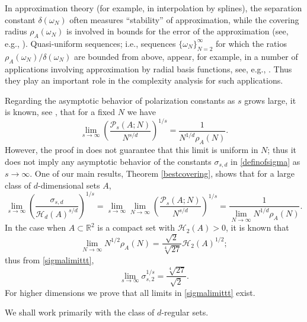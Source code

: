\documentclass[12pt]{amsart}
\theoremstyle{definition}
\def\R{\mathbb{R}}
\newcommand{\1}{\mathbf{1}}
\newcommand{\PP}{\mathcal{P}}
\def\H{\mathcal{H}}
\begin{document}
In approximation theory (for example, in interpolation by splines), the separation constant $\delta(\omega_N)$ often measures ``stability'' of approximation, while the covering radius $\rho_A(\omega_N)$ is involved in bounds for the error of the approximation (see, e.g., \cite{breger2016points}). Quasi-uniform sequences; i.e., sequences $\{\omega_N\}_{N=2}^\infty$ for which the ratios $\rho_A(\omega_N)/\delta(\omega_N)$ are bounded from above, appear, for example, in a number of applications involving approximation by radial basis functions, see, e.g., \cite{MR2740542}. Thus they play an important role in the complexity analysis for such applications. 

Regarding the asymptotic behavior of polarization constants as $s$ grows large, it is known, see \cite{Borodachov2016}, that for a fixed $N$ we have
$$
\lim_{s\to \infty}\left(\frac{\PP_s(A; N)}{N^{s/d}}\right)^{1/s} = \frac1{N^{1/d}\rho_A(N)}.
$$
However, the proof in \cite{Borodachov2016} does not guarantee that this limit is uniform in $N$; thus it does not imply any asymptotic behavior of the constants $\sigma_{s,d}$ in \eqref{definofsigma} as $s\to \infty$. One of our main results, Theorem \ref{bestcovering}, shows that for a large class of $d$-dimensional sets $A$,
\begin{equation}\label{sigmalimittt}
\lim_{s\to \infty}\left(\frac{\sigma_{s,d}}{\H_d(A)^{s/d}}\right)^{1/s}=\lim_{s\to \infty}\lim_{N\to \infty} \left(\frac{\PP_s(A; N)}{N^{s/d}}\right)^{1/s} = \frac{1}{\lim_{N\to \infty} N^{1/d} \rho_A(N)}.
\end{equation}
In the case when $A\subset \R^2$ is a compact set with $\H_2(A)>0$, it is known \cite{Kershner1939} that
$$
\lim_{N\to \infty} N^{1/2} \rho_A(N) = \frac{\sqrt{2}}{\sqrt[4]{27}} \H_2(A)^{1/2};
$$
thus from \eqref{sigmalimittt},
$$
\lim_{s\to \infty}\sigma_{s,2}^{1/s} = \frac{\sqrt[4]{27}}{\sqrt{2}}.
$$
For higher dimensions we prove that all limits in \eqref{sigmalimittt} exist.

\bigskip

We shall work primarily with the class of $d$-regular sets.
\end{document}
